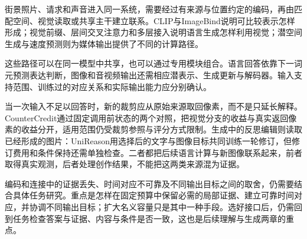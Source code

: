 街景照片、请求和声音进入同一系统，需要经过有来源与位置约定的编码，再由匹配空间、视觉读取或共享主干建立联系。CLIP与ImageBind说明可比较表示怎样形成；视觉前缀、层间交叉注意力和多层接入说明语言生成怎样利用视觉；潜空间生成与速度预测则为媒体输出提供了不同的计算路径。

这些路径可以在同一模型中共享，也可以通过专用模块组合。语言回答依靠下一词元预测表达判断，图像和音视频输出还需相应潜表示、生成更新与解码器。输入支持范围、训练过的对应关系和实际输出能力应分别确认。

当一次输入不足以回答时，新的裁剪应从原始来源取回像素，而不是只延长解释。CounterCredit通过固定调用前状态的两个对照，把视觉分支的收益与真实返回像素的收益分开，适用范围仍受裁剪参照与评分方式限制。生成中的反思编辑则读取已经形成的图片：UniReason用选择后的文字与图像目标共同训练一轮修订，但修订费用和条件保持还需单独检查。二者都把后续语言计算与新图像联系起来，前者取得真实观测，后者处理创作结果，不能把这两类来源混为证据。

编码和连接中的证据丢失、时间对应不可靠及不同输出目标之间的取舍，仍需要结合具体任务研究。重点是怎样在固定预算中保留必需的局部证据、建立可靠时间对应，并协调不同输出目标；扩大名义容量只是其中一种手段。选好接口后，仍需回到任务检查答案与证据、内容与条件是否一致，这也是后续理解与生成两章的重点。
